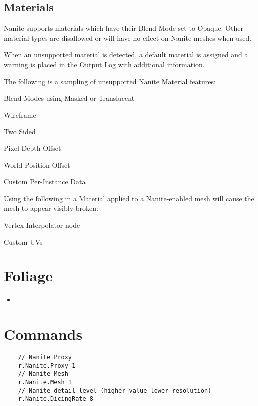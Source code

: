         \subsection{Materials}
        Nanite supports materials which have their Blend Mode set to Opaque. Other material types are disallowed or will have no effect on Nanite meshes when used.

When an unsupported material is detected, a default material is assigned and a warning is placed in the Output Log with additional information.

The following is a sampling of unsupported Nanite Material features:

    Blend Modes using Masked or Translucent


    Wireframe

    Two Sided

    Pixel Depth Offset

    World Position Offset

    Custom Per-Instance Data 

Using the following in a Material applied to a Nanite-enabled mesh will cause the mesh to appear visibly broken:

    Vertex Interpolator node

    Custom UVs 


    \section{Foliage}
        \begin{itemize}
            \item 
        \end{itemize}

    \section{Commands}
        \begin{lstlisting}
    // Nanite Proxy
    r.Nanite.Proxy 1
    // Nanite Mesh
    r.Nanite.Mesh 1
    // Nanite detail level (higher value lower resolution)
    r.Nanite.DicingRate 8
        \end{lstlisting}
